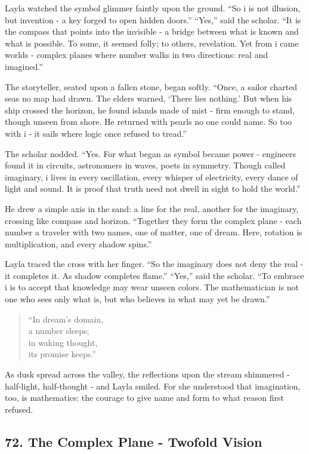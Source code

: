 \documentclass[
  letterpaper,
  DIV=11,
  numbers=noendperiod]{scrreprt}
\begin{document}
Layla watched the symbol glimmer faintly upon the ground. ``So i is not
illusion, but invention - a key forged to open hidden doors.'' ``Yes,''
said the scholar. ``It is the compass that points into the invisible - a
bridge between what is known and what is possible. To some, it seemed
folly; to others, revelation. Yet from i came worlds - complex planes
where number walks in two directions: real and imagined.''

The storyteller, seated upon a fallen stone, began softly. ``Once, a
sailor charted seas no map had drawn. The elders warned, `There lies
nothing.' But when his ship crossed the horizon, he found islands made
of mist - firm enough to stand, though unseen from shore. He returned
with pearls no one could name. So too with i - it sails where logic once
refused to tread.''

The scholar nodded. ``Yes. For what began as symbol became power -
engineers found it in circuits, astronomers in waves, poets in symmetry.
Though called imaginary, i lives in every oscillation, every whisper of
electricity, every dance of light and sound. It is proof that truth need
not dwell in sight to hold the world.''

He drew a simple axis in the sand: a line for the real, another for the
imaginary, crossing like compass and horizon. ``Together they form the
complex plane - each number a traveler with two names, one of matter,
one of dream. Here, rotation is multiplication, and every shadow
spins.''

Layla traced the cross with her finger. ``So the imaginary does not deny
the real - it completes it. As shadow completes flame.'' ``Yes,'' said
the scholar. ``To embrace i is to accept that knowledge may wear unseen
colors. The mathematician is not one who sees only what is, but who
believes in what may yet be drawn.''

\begin{quote}
``In dream's domain,\\
a number sleeps;\\
in waking thought,\\
its promise keeps.''
\end{quote}

As dusk spread across the valley, the reflections upon the stream
shimmered - half-light, half-thought - and Layla smiled. For she
understood that imagination, too, is mathematics: the courage to give
name and form to what reason first refused.

\subsection{72. The Complex Plane - Twofold
Vision}\label{the-complex-plane---twofold-vision}
\end{document}
